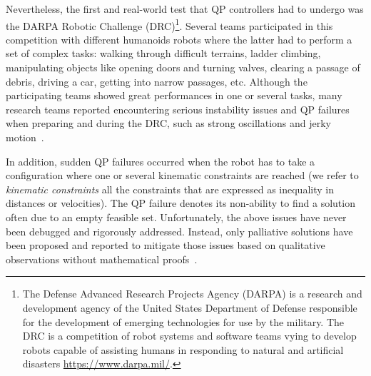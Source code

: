 Nevertheless, the first and real-world test that QP controllers had to undergo was the DARPA Robotic Challenge (DRC)\footnote{The Defense Advanced Research Projects Agency (DARPA) is a research and development agency of the United States Department of Defense responsible for the development of emerging technologies for use by the military. The DRC is a competition of robot systems and software teams vying to develop robots capable of assisting humans in responding to natural and artificial disasters \url{https://www.darpa.mil/}.}. Several teams participated in this competition with different humanoids robots where the latter had to perform a set of complex tasks: walking through difficult terrains, ladder climbing, manipulating objects like opening doors and turning valves, clearing a passage of debris, driving a car, getting into narrow passages, etc. Although the participating teams showed great performances in one or several tasks, many research teams reported encountering serious instability issues and QP failures when preparing and during the DRC, such as strong oscillations and jerky motion~\cite{feng2015journalOfFieldRobotics,johnson2015journalOfFieldRobotics,koolen2016ijhr,dedonato2017frontiers}. 

In addition,  sudden QP failures occurred when the robot has to take a configuration where one or several kinematic constraints are reached (we refer to \emph{kinematic constraints} all the constraints that are expressed as inequality in distances or velocities).   The QP failure denotes its non-ability to find a solution often due to an empty feasible set. 	
Unfortunately, the above issues have never been debugged and rigorously addressed. Instead, only palliative solutions have been proposed and reported to mitigate those issues based on qualitative observations without mathematical proofs~\cite{hopkins2015icra,kuindersma2016autonomousRobot,koolen2016ijhr,johnson2015journalOfFieldRobotics}. 


